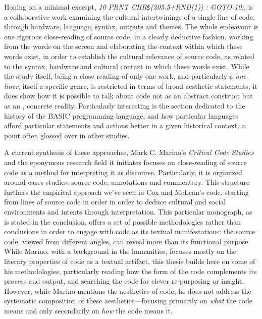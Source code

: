Honing on a minimal excerpt, \emph{10 PRNT CHR\lstinline{$}(205.5+RND(1)) : GOTO 10;}\cite{montfort_10_2014}, is a collaborative work examining the cultural intertwinings of a single line of code, through hardware, language, syntax, outputs and themes. The whole endeavour is one rigorous close-reading of source code, in a clearly deductive fashion, working from the words on the screen and elaborating the context within which these words exist, in order to establish the cultural relevance of source code, as related to the syntax, hardware and cultural context in which these words exist. While the study itself, being a close-reading of only one work, and particularly a \emph{one-liner}, itself a specific genre, is restricted in terms of broad aesthetic statements, it does show how it is possible to talk about code not as an abstract construct but as an , concrete reality. Particularly interesting is the section dedicated to the history of the BASIC programming language, and how particular languages afford particular statements and actions better in a given historical context, a point often glossed over in other studies.

A current synthesis of these approaches, Mark C. Marino's \emph{Critical Code Studies}\cite{marino_critical_2020} and the eponymous research field it initiates focuses on close-reading of source code as a method for interpreting it as discourse. Particularly, it is organized around cases studies: source code, annotations and commentary. This structure furthers the empirical approach we've seen in Cox and McLean's code, starting from lines of source code in order in order to deduce cultural and social environments and intents through interpretation. This particular monograph, as is stated in the conclusion, offers a set of possible methodologies rather than conclusions in order to engage with code as its textual manifestations: the source code, viewed from different angles, can reveal more than its functional purpose. While Marino, with a background in the humanities, focuses mostly on the literary properties of code as a textual artifact, this thesis builds here on some of his methodologies, particularly reading how the form of the code complements its process and output, and searching the code for clever re-purposing or insight. However, while Marino mentions the aesthetics of code, he does not address the systematic composition of these aesthetics—focusing primarily on \emph{what} the code means and only secondarily on \emph{how} the code means it.

